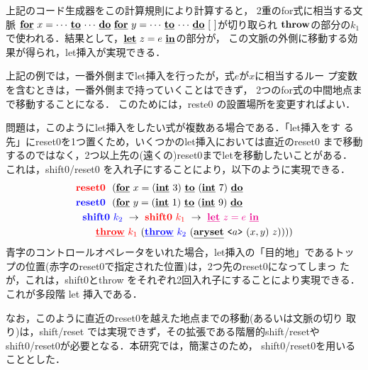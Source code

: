 上記のコード生成器をこの計算規則により計算すると，
2重のfor式に相当する文脈
$\cforin{x=\cdots}{\cdots}~\cforin{y=\cdots}{\cdots}~[~]$が切り取られ
$\Throw$の部分の$k_1$で使われる．結果として，$\cLet~z=e~\cIn$の部分が，
この文脈の外側に移動する効果が得られ，let挿入が実現できる．

上記の例では，一番外側までlet挿入を行ったが，式$e$が$x$に相当するルー
プ変数を含むときは，一番外側まで持っていくことはできず，
2つのfor式の中間地点まで移動することになる．
このためには，reste0 の設置場所を変更すればよい．

問題は，このようにlet挿入をしたい式が複数ある場合である．「let挿入をす
る先」にreset0を1つ置くため，いくつかのlet挿入においては直近のreset0
まで移動するのではなく，2つ以上先の(遠くの)reset0までletを移動したいことがある．
これは，shift0/reset0 を入れ子にすることにより，以下のように実現できる．
\begin{align*}
&\red{\Resetz} ~~(\cforin{x=(\cint~3)}{(\cint~7)} \\
&\blue{\Resetz} ~~(\cforin{y=(\cint~1)}{(\cint~9)} \\
&~~\blue{\Shiftz}~\blue{k_2}~\to~ \red{\Shiftz}~\red{k_1}~\to~ \magenta{\cLet~z=e~\cIn} \\
&~~~~~~
  \red{\cThrow}~\red{k_1}~(\blue{\cThrow}~\blue{k_2}~(\caryset{\code{a}}{(x,y)}{z}))))
\end{align*}
青字のコントロールオペレータをいれた場合，let挿入の「目的地」であるトッ
プの位置(赤字のreset0で指定された位置)は，2つ先のreset0になってしまっ
たが，これは，shift0とthrow をそれぞれ2回入れ子にすることにより実現できる．
これが多段階 let 挿入である．

なお，このように直近のreset0を越えた地点までの移動(あるいは文脈の切り
取り)は，shift/reset では実現できず，その拡張である階層的shift/resetや
shift0/reset0が必要となる．本研究では，簡潔さのため，
shift0/reset0を用いることとした．

